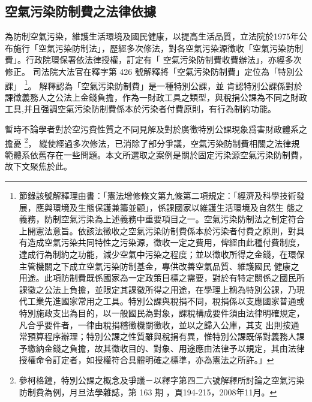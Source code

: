 \documentclass[14pt,a4paper]{article}
\begin{document}
\subsection{空氣污染防制費之法律依據}
為防制空氣污染，維護生活環境及國民健康，以提高生活品質，立法院於1975年公布施行「空氣污染防制法」，歷經多次修法，對各空氣污染源徵收「空氣污染防制費」。行政院環保署依法律授權，訂定有「	空氣污染防制費收費辦法」，亦經多次修正。
司法院大法官在釋字第 426 號解釋將「空氣污染防制費」定位為「特別公課」
\footnote{節錄該號解釋理由書：「憲法增修條文第九條第二項規定：「經濟及科學技術發展，應與環境及生態保護兼籌並顧」，係課國家以維護生活環境及自然生
態之義務，防制空氣污染為上述義務中重要項目之一。空氣污染防制法之制定符合上開憲法意旨。依該法徵收之空氣污染防制費係本於污染者付費之原則，對具有造成空氣污染共同特性之污染源，徵收一定之費用，俾經由此種付費制度，達成行為制約之功能，減少空氣中污染之程度；並以徵收所得之金錢，在環保主管機關之下成立空氣污染防制基金，專供改善空氣品質、維護國民
健康之用途。此項防制費既係國家為一定政策目標之需要，對於有特定關係之國民所課徵之公法上負擔，並限定其課徵所得之用途，在學理上稱為特別公課，乃現代工業先進國家常用之工具。特別公課與稅捐不同，稅捐係以支應國家普通或特別施政支出為目的，以一般國民為對象，課稅構成要件須由法律明確規定，凡合乎要件者，一律由稅捐稽徵機關徵收，並以之歸入公庫，其支
出則按通常預算程序辦理；特別公課之性質雖與稅捐有異，惟特別公課既係對義務人課予繳納金錢之負擔，故其徵收目的、對象、用途應由法律予以規定，其由法律授權命令訂定者，如授權符合具體明確之標準，亦為憲法之所許。」}。
解釋認為「空氣污染防制費」是一種特別公課，並
肯認特別公課係對於課徵義務人之公法上金錢負擔，作為一財政工具之類型，與稅捐公課為不同之財政工具,并且强調空氣污染防制費係本於污染者付費原則，有行為制約功能。

暫時不論學者對於空污費性質之不同見解及對於廣徵特別公課現象爲害財政體系之擔憂
\footnote{參柯格鐘，特別公課之概念及爭議－以釋字第四二六號解釋所討論之空氣污染防制費為例，月旦法學雜誌，第 163 期 ，頁194-215，2008年11月。}，
縱使經過多次修法，已消除了部分爭議，空氣污染防制費相關之法律規範體系依舊存在一些問題。本文所選取之案例是關於固定污染源空氣污染防制費，故下文聚焦於此。
\end{document}
